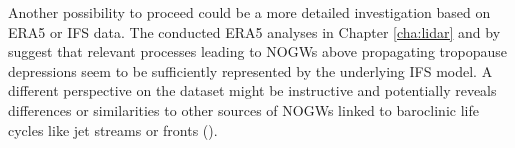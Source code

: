 Another possibility to proceed could be a more detailed investigation based on ERA5 or IFS data. The conducted ERA5 analyses in Chapter \ref{cha:lidar} and by \textcite{dornbrack_stratospheric_2022} suggest that relevant processes leading to NOGWs above propagating tropopause depressions seem to be sufficiently represented by the underlying IFS model. A different perspective on the dataset might be instructive and potentially reveals differences or similarities to other sources of NOGWs linked to baroclinic life cycles like jet streams or fronts (\cite{plougonven_internal_2014}).







%
